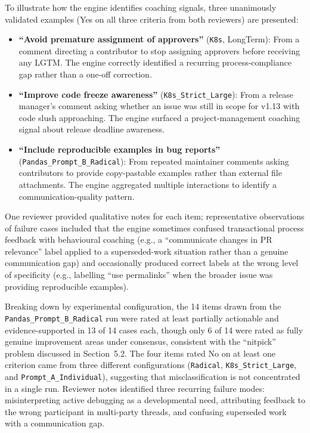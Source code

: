 \documentclass[a4paper,UKenglish,cleveref,autoref]{lipics-v2021}
\begin{document}
To illustrate how the engine identifies coaching signals, three unanimously validated examples (Yes on all three criteria from both reviewers) are presented:
\begin{itemize}
	\item \textbf{``Avoid premature assignment of approvers''} (\texttt{K8s}, LongTerm): From a comment directing a contributor to stop assigning approvers before receiving any LGTM. The engine correctly identified a recurring process-compliance gap rather than a one-off correction.
	\item \textbf{``Improve code freeze awareness''} (\texttt{K8s\_Strict\_Large}): From a release manager's comment asking whether an issue was still in scope for v1.13 with code slush approaching. The engine surfaced a project-management coaching signal about release deadline awareness.
	\item \textbf{``Include reproducible examples in bug reports''} (\texttt{Pandas\_Prompt\_B\_Radical}): From repeated maintainer comments asking contributors to provide copy-pastable examples rather than external file attachments. The engine aggregated multiple interactions to identify a communication-quality pattern.
\end{itemize}

One reviewer provided qualitative notes for each item; representative observations of failure cases included that the engine sometimes confused transactional process feedback with behavioural coaching (e.g., a ``communicate changes in PR relevance'' label applied to a superseded-work situation rather than a genuine communication gap) and occasionally produced correct labels at the wrong level of specificity (e.g., labelling ``use permalinks'' when the broader issue was providing reproducible examples).

Breaking down by experimental configuration, the 14 items drawn from the \texttt{Pandas\_Prom\-pt\_B\_Radical} run were rated at least partially actionable and evidence-supported in 13 of 14 cases each, though only 6 of 14 were rated as fully genuine improvement areas under consensus, consistent with the ``nitpick'' problem discussed in Section~5.2. The four items rated No on at least one criterion came from three different configurations (\texttt{Radical}, \texttt{K8s\_Strict\_Large}, and \texttt{Prompt\_A\_Individual}), suggesting that misclassification is not concentrated in a single run. Reviewer notes identified three recurring failure modes: misinterpreting active debugging as a developmental need, attributing feedback to the wrong participant in multi-party threads, and confusing superseded work with a communication gap.
\end{document}
